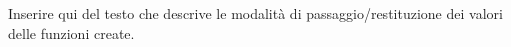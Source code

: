 \documentclass[../Relazione.tex]{subfiles}
\begin{document}
Inserire qui del testo che descrive
le modalità di passaggio/restituzione
dei valori delle funzioni create.
\end{document}
